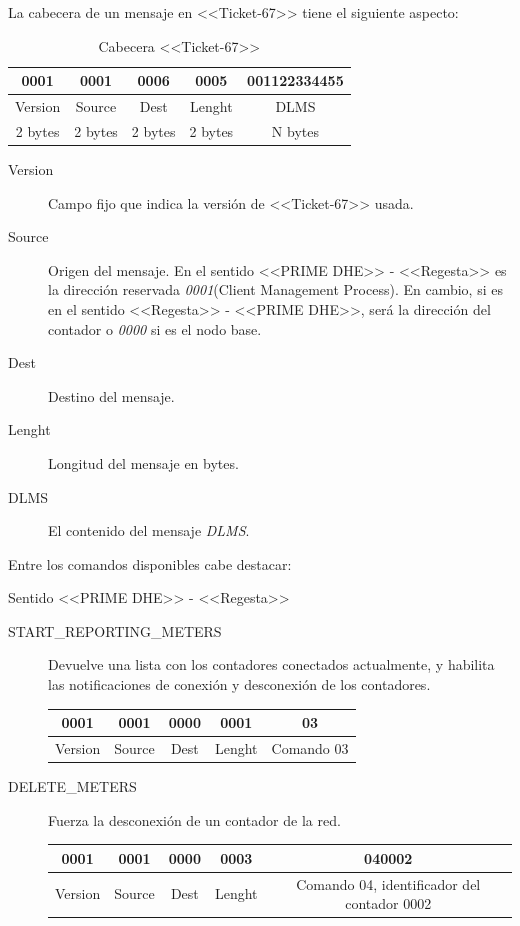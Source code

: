 La cabecera de un mensaje en <<Ticket-67>> tiene el siguiente aspecto:

\begin{table}[h]
	\centering
	\begin{tabular}{cccccccc}
		\toprule
		0001 & 0001 & 0006 & 0005 & \multicolumn{4}{c}{001122334455}\\ \midrule
		Version & Source & Dest & Lenght & \multicolumn{4}{c}{DLMS} \\ 
		2 bytes & 2 bytes & 2 bytes & 2 bytes & \multicolumn{4}{c}{N bytes}\\
		\bottomrule
	\end{tabular}
	\caption{Cabecera <<Ticket-67>>}
	\label{tab:CabeceraTicket67}
\end{table}

\begin{description}
	\item[Version] Campo fijo que indica la versión de <<Ticket-67>> usada.
	\item[Source] Origen del mensaje. En el sentido <<PRIME DHE>> - <<Regesta>> es la dirección reservada \textsl{0001}(Client Management Process). En cambio, si es en el sentido <<Regesta>> - <<PRIME DHE>>, será la dirección del contador o \textsl{0000} si es el nodo base.
	\item[Dest] Destino del mensaje.
	\item[Lenght] Longitud del mensaje en bytes.
	\item[DLMS] El contenido del mensaje \textsl{DLMS}.
\end{description}

Entre los comandos disponibles cabe destacar:

Sentido <<PRIME DHE>> - <<Regesta>>
\begin{description}
	\item[START\_REPORTING\_METERS] Devuelve una lista con los contadores conectados actualmente, y habilita las notificaciones de conexión y desconexión de los contadores.
		\begin{table}[h]
			\centering
			\begin{tabular}{cccccccc}
				\midrule
				0001 & 0001 & 0000 & 0001 & \multicolumn{4}{c}{03}\\ \midrule
				Version & Source & Dest & Lenght & \multicolumn{4}{c}{Comando 03} \\ 
				\bottomrule
			\end{tabular}
		\end{table}
	\item[DELETE\_METERS] Fuerza la desconexión de un contador de la red.
	\begin{table}[h]
		\centering
		\begin{tabular}{cccccccc}
			\midrule
			0001 & 0001 & 0000 & 0003 & \multicolumn{4}{c}{040002}\\ \midrule
			Version & Source & Dest & Lenght & \multicolumn{4}{c}{Comando 04, identificador del contador 0002} \\ 
			\bottomrule
		\end{tabular}
	\end{table}
\end{description}


